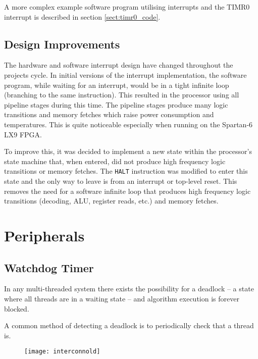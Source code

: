 A more complex example software program utilising interrupts and the TIMR0 interrupt is described in section \ref{sect:timr0_code}.

\section{Design Improvements}
The hardware and software interrupt design have changed throughout the projects cycle. In initial versions of the interrupt implementation, the software program, while waiting for an interrupt, would be in a tight infinite loop (branching to the same instruction). This resulted in the processor using all pipeline stages during this time. The pipeline stages produce many logic transitions and memory fetches which raise power consumption and temperatures. This is quite noticeable especially when running on the Spartan-6 LX9 FPGA.

To improve this, it was decided to implement a new state within the processor's state machine that, when entered, did not produce high frequency logic transitions or memory fetches. The \verb|HALT| instruction was modified to enter this state and the only way to leave is from an interrupt or top-level reset. This removes the need for a software infinite loop that produces high frequency logic transitions (decoding, ALU, register reads, etc.) and memory fetches.

\newpage
\chapter{Peripherals}
{%
\startcontents[chapters]
}

\section{Watchdog Timer}
In any multi-threaded system there exists the possibility for a deadlock -- a state where all threads are in a waiting state -- and algorithm execution is forever blocked.

A common method of detecting a deadlock is to periodically check that a thread is.

\begin{figure}[h]
\centering
\texttt{[image: interconnold]}
\end{figure}

